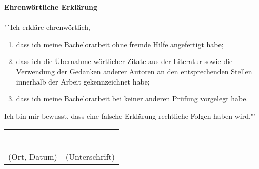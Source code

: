 \documentclass[../Document.tex]{subfiles}
\begin{document}
\thispagestyle{empty}
\vspace{0.5cm}
\noindent
\textbf{Ehrenwörtliche Erklärung}\\
\\
"`Ich erkläre ehrenwörtlich,
\begin{enumerate}
	\item dass ich meine Bachelorarbeit ohne fremde Hilfe angefertigt habe;
	\item dass ich die Übernahme wörtlicher Zitate aus der Literatur sowie die Verwendung der Gedanken anderer Autoren an den entsprechenden Stellen innerhalb der Arbeit gekennzeichnet habe;
	\item dass ich meine Bachelorarbeit bei keiner anderen Prüfung vorgelegt habe.
\end{enumerate}
Ich bin mir bewusst, dass eine falsche Erklärung rechtliche Folgen haben wird."'
\\
\vspace{2.0cm}

\begin{tabular}{ p{} l}
\rule{0.4\textwidth}{1pt}&\rule{0.4\textwidth}{1pt}\\
(Ort, Datum)&(Unterschrift)\\
\end{tabular}
\end{document}
